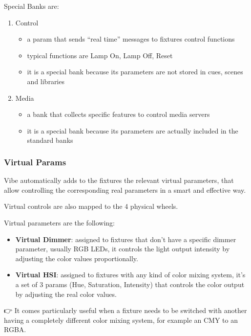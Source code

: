 \documentclass[
]{article}
\begin{document}
Special Banks are:

\begin{enumerate}
\def\labelenumi{\arabic{enumi}.}
\item
  Control

  \begin{itemize}
  \item
    a param that sends ``real time'' messages to fixtures control functions
  \item
    typical functions are Lamp On, Lamp Off, Reset
  \item
    it is a special bank because its parameters are not stored in cues, scenes and libraries
  \end{itemize}
\item
  Media

  \begin{itemize}
  \item
    a bank that collects specific features to control media servers
  \item
    it is a special bank because its parameters are actually included in the standard banks
  \end{itemize}
\end{enumerate}

\hypertarget{virtual-params}{%
\subsubsection{Virtual Params}\label{virtual-params}}

Vibe automatically adds to the fixtures the relevant virtual parameters, that allow controlling the corresponding real parameters in a smart and effective way.

Virtual controls are also mapped to the 4 physical wheels.

Virtual parameters are the following:

\begin{itemize}
\item
  \textbf{Virtual Dimmer}: assigned to fixtures that don't have a specific dimmer parameter, usually RGB LEDs, it controls the light output intensity by adjusting the color values proportionally.
\item
  \textbf{Virtual HSI}: assigned to fixtures with any kind of color mixing system, it's a set of 3 params (Hue, Saturation, Intensity) that controls the color output by adjusting the real color values.
\end{itemize}

👉 It comes particularly useful when a fixture needs to be switched with another having a completely different color mixing system, for example an CMY to an RGBA.
\end{document}
